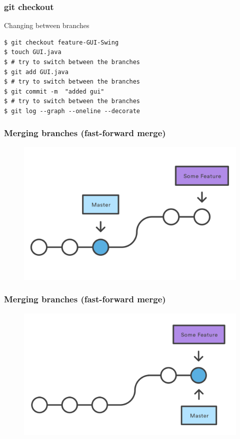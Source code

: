 \documentclass{beamer}
\begin{document}
\begin{frame}[fragile]
\frametitle{git checkout}

Changing between branches

\begin{lstlisting}
$ git checkout feature-GUI-Swing
$ touch GUI.java
$ # try to switch between the branches
$ git add GUI.java
$ # try to switch between the branches
$ git commit -m  "added gui"
$ # try to switch between the branches
$ git log --graph --oneline --decorate
\end{lstlisting}
\end{frame}


\begin{frame}
\frametitle{Merging branches (fast-forward merge)}

\begin{figure}
\includegraphics[scale=0.8]{figures/f13.png}
\end{figure}

\end{frame}

\begin{frame}
\frametitle{Merging branches (fast-forward merge)}

\begin{figure}
\includegraphics[scale=0.8]{figures/f14.png}
\end{figure}

\end{frame}
\end{document}
